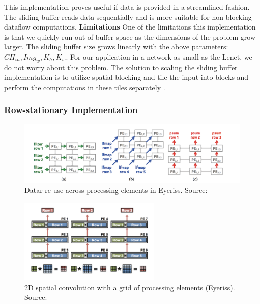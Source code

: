 This implementation proves useful if data is provided in a streamlined fashion. The sliding buffer reads data sequentially and is more suitable for non-blocking dataflow computations.
\newline
\textbf{Limitations}
\newline
One of the limitations this implementation is that we quickly run out of buffer space as the dimensions of the problem grow larger. The sliding buffer size grows linearly with the above parameters: $ CH_{in}, Img_{w}, K_h, K_w $. For our application in a network as small as the Lenet, we do not worry about this problem. The solution to scaling the sliding buffer implementation is to utilize spatial blocking and tile the input into blocks and perform the computations in these tiles separately \cite{2018combined}.

\subsubsection{Row-stationary Implementation} \label{rowimpl}

\begin{figure}[h]
\centering
\includegraphics[width=1.0\textwidth]{Figures/eyeriss}
\decoRule
\caption[Data Re-use in Eyeriss]{ Datar re-use across processing elements in Eyeriss. Source: \cite{eyeriss}}
\label{fig:eyeriss}
\end{figure}

\begin{figure}[h]
\centering
\includegraphics[width=0.6\textwidth]{Figures/eyeriss2}
\decoRule
\caption[2D Spatial Convolution]{ 2D spatial convolution with a grid of processing elements (Eyeriss). Source: \cite{sze2017efficient}}
\label{fig:eyeriss2}
\end{figure}

